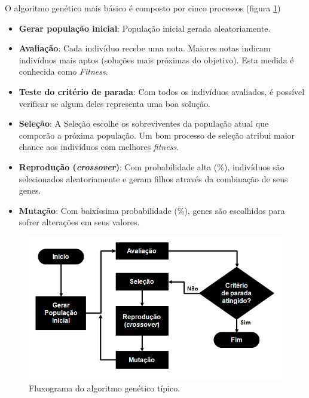O algoritmo genético mais básico é composto por cinco processos (figura \ref{fig:fluxoGABasico})

\begin{itemize}

	\item \textbf{Gerar população inicial}: População inicial gerada aleatoriamente.
	
	\item \textbf{Avaliação}: Cada indivíduo recebe uma nota. Maiores notas indicam indivíduos mais aptos (soluções mais próximas do objetivo). Esta medida é conhecida como \textit{Fitness}. 
	
	\item \textbf{Teste do critério de parada}: Com todos os indivíduos avaliados, é possível verificar se algum deles representa uma boa solução.
 
	\item \textbf{Seleção}: A Seleção escolhe os sobreviventes da população atual que comporão a próxima população. Um bom processo de seleção atribui maior chance aos indivíduos com melhores \emph{fitness}.
 
	\item \textbf{Reprodução (\emph{crossover})}: Com probabilidade alta (\%), indivíduos são selecionados aleatoriamente e geram filhos através da combinação de seus genes.
	
	\item \textbf{Mutação}: Com baixíssima probabilidade (\%), genes são escolhidos para sofrer alterações em seus valores.
	
\end{itemize} 

\begin{figure}[htbp]
	\centering
		\includegraphics[width=1.00\textwidth]{figs/ga/fluxoGABasico.png}
	\caption{Fluxograma do algoritmo genético típico.}
	\label{fig:fluxoGABasico}
\end{figure}

